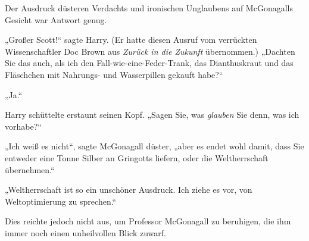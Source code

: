 Der Ausdruck düsteren Verdachts und ironischen Unglaubens auf McGonagalls Gesicht war Antwort genug.

„Großer Scott!“ sagte Harry. (Er hatte diesen Ausruf vom verrückten Wissenschaftler Doc Brown aus \emph{Zurück in die Zukunft} übernommen.) „Dachten Sie das auch, als ich den Fall-wie-eine-Feder-Trank, das Dianthuskraut und das Fläschchen mit Nahrungs- und Wasserpillen gekauft habe?“%

„Ja.“

Harry schüttelte erstaunt seinen Kopf. „Sagen Sie, was \emph{glauben} Sie denn, was ich vorhabe?“

„Ich weiß es nicht“, sagte McGonagall düster, „aber es endet wohl damit, dass Sie entweder eine Tonne Silber an Gringotts liefern, oder die Weltherrschaft übernehmen.“

„Weltherrschaft ist so ein unschöner Ausdruck. Ich ziehe es vor, von Weltoptimierung zu sprechen.“

Dies reichte jedoch nicht aus, um Professor McGonagall zu beruhigen, die ihm immer noch einen unheilvollen Blick zuwarf.

